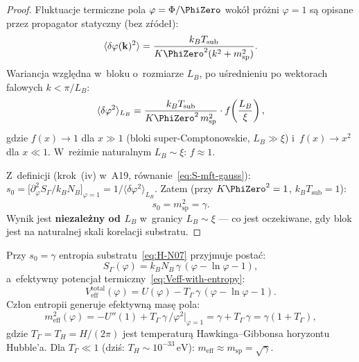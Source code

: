 \begin{proof}
Fluktuacje termiczne pola $\varphi = \Phi/\PhiZero$ wok\'o\l{}
pr\'o\.zni $\varphi = 1$ s\k{a} opisane przez propagator
statyczny (bez z\'r\'ode\l{}):
\begin{equation}\label{eq:B-propagator}
  \langle\delta\varphi(\mathbf{k})^2\rangle
  = \frac{k_B T_{\mathrm{sub}}}{K\PhiZero^2(k^2 + m_{\mathrm{sp}}^2)}.
\end{equation}
Wariancja wzgl\k{e}dna w~bloku o~rozmiarze $L_B$,
po u\'srednieniu po wektorach falowych $k < \pi/L_B$:
\begin{equation}\label{eq:B-var-block}
  \langle\delta\varphi^2\rangle_{L_B}
  = \frac{k_B T_{\mathrm{sub}}}{K\PhiZero^2\,m_{\mathrm{sp}}^2}
  \cdot f\!\left(\frac{L_B}{\xi}\right),
\end{equation}
gdzie $f(x) \to 1$ dla $x \gg 1$ (bloki super-Comptonowskie,
$L_B \gg \xi$) i~$f(x) \to x^2$ dla $x \ll 1$.
W~re\.zimie naturalnym $L_B \sim \xi$: $f \approx 1$.

Z~definicji (krok~(iv) w~A19, r\'ownanie~\eqref{eq:S-mft-gauss}):
$s_0 = \bigl[\partial^2_\varphi S_\Gamma/k_B N_B\bigr]_{\varphi=1}
= 1/\langle\delta\varphi^2\rangle_{L_B}$.
Zatem (przy $K\PhiZero^2 = 1$, $k_B T_{\mathrm{sub}} = 1$):
\begin{equation}
  s_0 = m_{\mathrm{sp}}^2 = \gamma.
\end{equation}
Wynik jest \textbf{niezale\.zny od $L_B$} w~granicy $L_B \sim \xi$
--- co jest oczekiwane, gdy blok jest na naturalnej
skali korelacji substratu.
\end{proof}

\begin{corollary}\label{cor:entropy-potential}
Przy $s_0 = \gamma$ entropia substratu~\eqref{eq:H-N07}
przyjmuje posta\'c:
\begin{equation}\label{eq:B-entropy-explicit}
  S_\Gamma(\varphi) = k_B N_B\,\gamma\,(\varphi - \ln\varphi - 1),
\end{equation}
a~efektywny potencja\l{} termiczny~\eqref{eq:Veff-with-entropy}:
\begin{equation}\label{eq:B-Veff-total}
  V_{\mathrm{eff}}^{\mathrm{total}}(\varphi)
  = U(\varphi) - T_\Gamma\,\gamma\,(\varphi - \ln\varphi - 1).
\end{equation}
Cz\l{}on entropii generuje efektywn\k{a} mas\k{e} pola:
\begin{equation}\label{eq:B-meff-entropy}
  m_{\mathrm{eff}}^2(\varphi)
  = -U''(1) + T_\Gamma\,\gamma\,/\varphi^2\big|_{\varphi=1}
  = \gamma + T_\Gamma\,\gamma
  = \gamma(1 + T_\Gamma),
\end{equation}
gdzie $T_\Gamma = T_H = H/(2\pi)$ jest temperatur\k{a}
Hawkinga--Gibbonsa horyzontu Hubble'a.
Dla $T_\Gamma \ll 1$ (dzi\'s: $T_H \sim 10^{-33}\,\mathrm{eV}$):
$m_{\mathrm{eff}} \approx m_{\mathrm{sp}} = \sqrt{\gamma}$.
\end{corollary}

